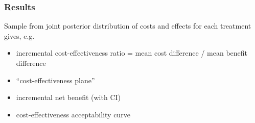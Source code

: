 \begin{frame}

\frametitle{Results}

Sample from \alert{joint posterior distribution} of costs and effects
for each treatment gives, e.g. 
\begin{itemize}
\item \alert{incremental cost-effectiveness ratio} = mean cost difference / mean benefit difference
\item ``cost-effectiveness plane''
\item incremental net benefit (with CI)
\item cost-effectiveness acceptability curve
\end{itemize}

\begin{center}
\end{center}

\end{frame}


